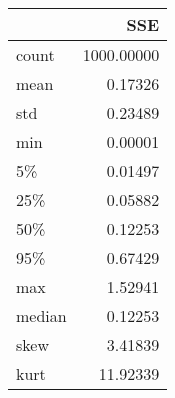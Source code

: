\begin{tabular}{lr}
\toprule
{} &  SSE \\
\midrule
count  &    1000.00000 \\
mean   &       0.17326 \\
std    &       0.23489 \\
min    &       0.00001 \\
5\%     &       0.01497 \\
25\%    &       0.05882 \\
50\%    &       0.12253 \\
95\%    &       0.67429 \\
max    &       1.52941 \\
median &       0.12253 \\
skew   &       3.41839 \\
kurt   &      11.92339 \\
\bottomrule
\end{tabular}
